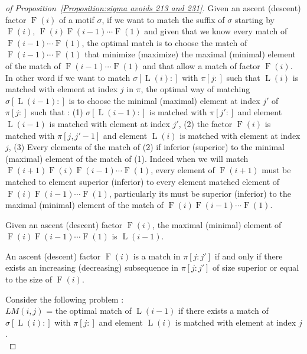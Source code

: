 \documentclass[a4paper]{llncs}
\newcommand{\ptext}{\pi}
\newcommand{\pmotif}{\sigma}
\DeclareMathOperator{\firsta}{L}
\newcommand{\first}[1]{\firsta({#1})}
\DeclareMathOperator{\factora}{F}
\newcommand{\factor}[1]{\factora({#1})}
\begin{document}
\begin{proof}[of Proposition~\ref{Proposition:sigma avoids 213 and 231}]
Given an ascent (descent) factor $\factor{i}$ of a motif $\pmotif$, if we want to match the suffix of $\pmotif$ starting by $\factor{i}$, $\factor{i}\factor{i-1}\cdots\factor{1}$ and given that we know every match of $\factor{i-1}\cdots\factor{1}$, the optimal match is to choose the match of $\factor{i-1}\cdots\factor{1}$ that minimize (maximize) the maximal (minimal) element of the match of $\factor{i-1}\cdots\factor{1}$ and that allow a match of factor $\factor{i}$. In other word if we want to match $\pmotif[\first{i}:]$ with $\ptext[j:]$ such that $\first{i}$ is matched with element at index $j$ in $\ptext$, the optimal way of matching $\pmotif[\first{i-1}:]$ is to choose the minimal (maximal) element at index $j'$ of $\ptext[j:]$ such that : (1) $\pmotif[\first{i-1}:]$ is matched with $\ptext[j':]$ and element $\first{i-1}$ is matched with element at index $j'$, (2) the factor $\factor{i}$ is matched with $\ptext[j,j'-1]$ and element $\first{i}$ is matched with element at index $j$, (3) Every elements of the match of (2) if inferior (superior) to the minimal (maximal) element of the match of (1). Indeed when we will match $\factor{i+1}\factor{i}\factor{i-1}\cdots\factor{1}$, every element of $\factor{i+1}$ must be matched to element superior (inferior) to every element matched element of $\factor{i}\factor{i-1}\cdots\factor{1}$, particularly its must be superior (inferior) to the maximal (minimal) element of the match of $\factor{i}\factor{i-1}\cdots\factor{1}$.

\begin{remark}
Given an ascent (descent) factor $\factor{i}$, the maximal (minimal) element of $\factor{i}\factor{i-1}\cdots\factor{1}$ is $\first{i-1}$.
\end{remark}

\begin{remark}
An ascent (descent) factor 	$\factor{i}$ is a match in $\ptext[j:j']$  if and only if there exists an increasing (decreasing) subsequence in $\ptext[j:j']$ of size superior or equal to the size of $\factor{i}$.
\end{remark}

Consider the following problem :\\
$LM(i,j)$ = the optimal match of $\first{i-1}$
	if there exists a match of $\pmotif[\first{i}:]$
	with $\ptext[j:]$
	and element $\first{i}$
	is matched with element at index $j$.\\


\end{proof}
\end{document}
